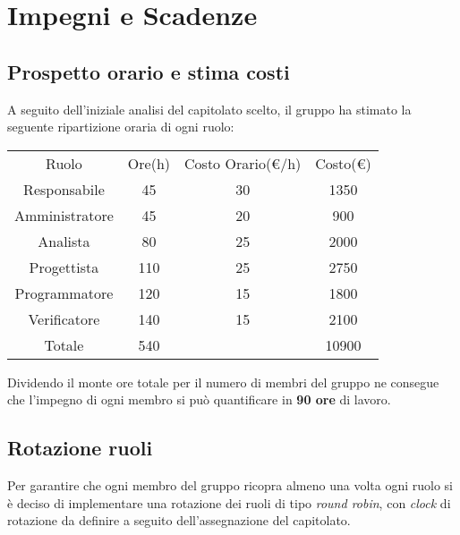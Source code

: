 \section{Impegni e Scadenze}\label{section:impegni_scadenze}

\subsection{Prospetto orario e stima costi}\label{section:prospetto_orario}

A seguito dell'iniziale analisi del capitolato scelto, il gruppo ha stimato la seguente ripartizione
oraria di ogni ruolo:

\begin{center}
    \begin{tabular}{|c|c|c|c|}
        \hline
        Ruolo          & Ore(h) & Costo Orario(\euro{}\slash h) & Costo(\euro{}) \\
        Responsabile   & 45     & 30                            & 1350           \\
        Amministratore & 45     & 20                            & 900            \\
        Analista       & 80     & 25                            & 2000           \\
        Progettista    & 110    & 25                            & 2750           \\
        Programmatore  & 120    & 15                            & 1800           \\
        Verificatore   & 140    & 15                            & 2100           \\
        \hline
        Totale         & 540    &                               & 10900          \\
        \hline
    \end{tabular}
\end{center}

Dividendo il monte ore totale per il numero di membri del gruppo ne consegue che l'impegno di ogni membro si
può quantificare in \textbf{90 ore} di lavoro.

\subsection{Rotazione ruoli}\label{section:rotazione_ruoli}

Per garantire che ogni membro del gruppo ricopra almeno una volta ogni ruolo si è deciso di implementare
una rotazione dei ruoli di tipo \textit{round robin}, con \textit{clock} di rotazione da definire a
seguito dell'assegnazione del capitolato.

